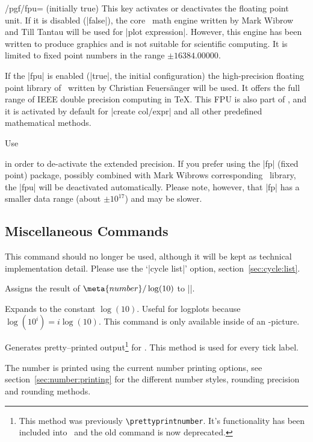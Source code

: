 \begin{key}{/pgf/fpu= (initially true)}
	This key activates or deactivates the floating point unit. If it is disabled (|false|), the core \PGF\ math engine written by Mark Wibrow and Till Tantau will be used for |plot expression|.
	However, this engine has been written to produce graphics and is not suitable for scientific computing. It is limited to fixed point numbers in the range $\pm 16384.00000$.

	If the |fpu| is enabled (|true|, the initial configuration) the high-precision floating point library of \PGF\ written by Christian Feuers\"anger will be used. It offers the full range of IEEE double precision computing in \TeX. This FPU is also part of \PGFPlotstable, and it is activated by default for |create col/expr| and all other predefined mathematical methods.

	Use
\begin{codeexample}
\end{codeexample}
	\noindent in order to de-activate the extended precision. If you prefer using the |fp| (fixed point) package, possibly combined with Mark Wibrows corresponding \PGF\ library, the |fpu| will be deactivated automatically. Please note, however, that |fp| has a smaller data range (about $\pm 10^{17}$) and may be slower.
\end{key}

\subsection{Miscellaneous Commands}
\begin{command}{\autoplotspeclist}
This command should no longer be used, although it will be kept as technical implementation detail. Please use the `|cycle list|' option, section~\ref{sec:cycle:list}.
\end{command}

\begin{command}{\pgfmathlogtologten{}}
Assigns the result of $\meta{number}/\log(10)$ to |\pgfmathresult|.
\end{command}

\begin{command}{\logten}
Expands to the constant $\log(10)$. Useful for logplots because $\log(10^i) = i\log(10)$. This command is only available inside of an \Tikz-picture.
\end{command}

\begin{command}{\pgfmathprintnumber{}}
Generates pretty--printed output\footnote{This method was previously \texttt{\textbackslash prettyprintnumber}. It's functionality has been included into \PGF\ and the old command is now deprecated.} for . This method is used for every tick label.

The number is printed using the current number printing options, see section~\ref{sec:number:printing} for the different number styles, rounding precision and rounding methods.
\end{command}

